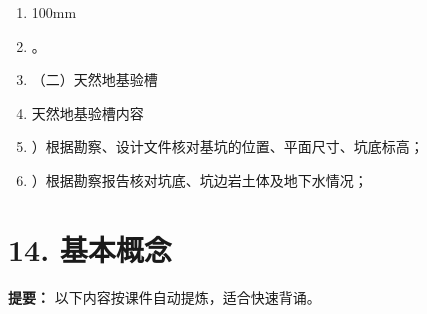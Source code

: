 \documentclass[UTF8,fontset=fandol,11pt]{ctexart}
\begin{document}
\begin{enumerate}[label=\arabic*.]
\item 100mm

\item 。

\item （二）天然地基验槽

\item 天然地基验槽内容

\item ）根据勘察、设计文件核对基坑的位置、平面尺寸、坑底标高；

\item ）根据勘察报告核对坑底、坑边岩土体及地下水情况；

\end{enumerate}

\newpage

\section*{14. 基本概念}


\begin{mainbox}

\textbf{提要：} 以下内容按课件自动提炼，适合快速背诵。

\end{mainbox}
\end{document}
